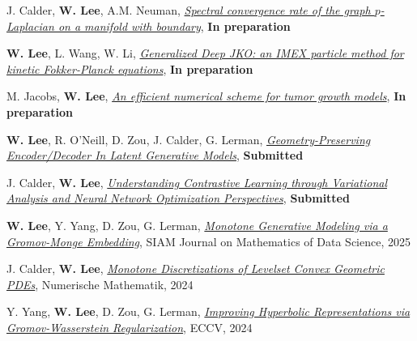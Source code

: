 

\begin{cvparagraph}

\vspace{0.5cm}
\begin{cvitems}
  \item J. Calder, \textbf{W. Lee}, A.M. Neuman, \href{}{\textit{Spectral convergence rate of the graph $p$-Laplacian on a manifold with boundary}}, \textbf{In preparation}
    \medskip
  \item \textbf{W. Lee}, L. Wang, W. Li, \href{}{\textit{Generalized Deep JKO: an IMEX particle method for kinetic Fokker-Planck equations}}, \textbf{In preparation}
  \medskip
  \item M. Jacobs, \textbf{W. Lee}, \href{}{\textit{An efficient numerical scheme for tumor growth models}}, \textbf{In preparation}
    \medskip
  \item \textbf{W. Lee}, R. O'Neill, D. Zou, J. Calder, G. Lerman, \href{https://arxiv.org/abs/2501.09876}{\textit{Geometry-Preserving Encoder/Decoder In Latent Generative Models}}, \textbf{Submitted} %
    \medskip
  \item J. Calder, \textbf{W. Lee}, \href{https://openreview.net/pdf?id=qjoDJjVZxB}{\textit{Understanding Contrastive Learning through Variational Analysis and Neural Network Optimization Perspectives}}, \textbf{Submitted}
    \medskip
  \item \textbf{W. Lee}, Y. Yang, D. Zou, G. Lerman, \href{https://arxiv.org/abs/2311.01375}{\textit{Monotone Generative Modeling via a Gromov-Monge Embedding}}, SIAM Journal on Mathematics of Data Science, 2025
    \medskip
  \item J. Calder, \textbf{W. Lee}, \href{https://rdcu.be/dZfbw}{\textit{Monotone Discretizations of Levelset Convex Geometric PDEs}}, Numerische Mathematik, 2024
    \medskip
  \item Y. Yang, \textbf{W. Lee}, D. Zou, G. Lerman, \href{http://arxiv.org/abs/2407.10495}{\textit{Improving Hyperbolic Representations via Gromov-Wasserstein Regularization}}, ECCV, 2024

\end{cvitems}
\end{cvparagraph}

